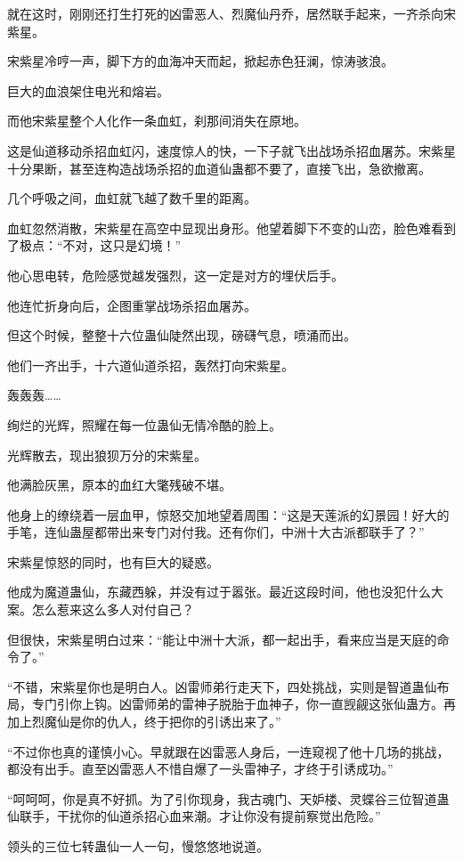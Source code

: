 \begin{this_body}
就在这时，刚刚还打生打死的凶雷恶人、烈魔仙丹乔，居然联手起来，一齐杀向宋紫星。

宋紫星冷哼一声，脚下方的血海冲天而起，掀起赤色狂澜，惊涛骇浪。

巨大的血浪架住电光和熔岩。

而他宋紫星整个人化作一条血虹，刹那间消失在原地。

这是仙道移动杀招血虹闪，速度惊人的快，一下子就飞出战场杀招血屠苏。宋紫星十分果断，甚至连构造战场杀招的血道仙蛊都不要了，直接飞出，急欲撤离。

几个呼吸之间，血虹就飞越了数千里的距离。

血虹忽然消散，宋紫星在高空中显现出身形。他望着脚下不变的山峦，脸色难看到了极点：“不对，这只是幻境！”

他心思电转，危险感觉越发强烈，这一定是对方的埋伏后手。

他连忙折身向后，企图重掌战场杀招血屠苏。

但这个时候，整整十六位蛊仙陡然出现，磅礴气息，喷涌而出。

他们一齐出手，十六道仙道杀招，轰然打向宋紫星。

轰轰轰……

绚烂的光辉，照耀在每一位蛊仙无情冷酷的脸上。

光辉散去，现出狼狈万分的宋紫星。

他满脸灰黑，原本的血红大氅残破不堪。

他身上的缭绕着一层血甲，惊怒交加地望着周围：“这是天莲派的幻景园！好大的手笔，连仙蛊屋都带出来专门对付我。还有你们，中洲十大古派都联手了？”

宋紫星惊怒的同时，也有巨大的疑惑。

他成为魔道蛊仙，东藏西躲，并没有过于嚣张。最近这段时间，他也没犯什么大案。怎么惹来这么多人对付自己？

但很快，宋紫星明白过来：“能让中洲十大派，都一起出手，看来应当是天庭的命令了。”

“不错，宋紫星你也是明白人。凶雷师弟行走天下，四处挑战，实则是智道蛊仙布局，专门引你上钩。凶雷师弟的雷神子脱胎于血神子，你一直觊觎这张仙蛊方。再加上烈魔仙是你的仇人，终于把你的引诱出来了。”

“不过你也真的谨慎小心。早就跟在凶雷恶人身后，一连窥视了他十几场的挑战，都没有出手。直至凶雷恶人不惜自爆了一头雷神子，才终于引诱成功。”

“呵呵呵，你是真不好抓。为了引你现身，我古魂门、天妒楼、灵蝶谷三位智道蛊仙联手，干扰你的仙道杀招心血来潮。才让你没有提前察觉出危险。”

领头的三位七转蛊仙一人一句，慢悠悠地说道。


\end{this_body}
